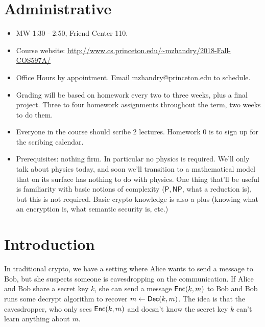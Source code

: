 




\section{Administrative}
\begin{itemize}
\item MW 1:30 - 2:50, Friend Center 110.
\item Course website: \url{http://www.cs.princeton.edu/~mzhandry/2018-Fall-COS597A/}
\item Office Hours by appointment. Email mzhandry@princeton.edu to schedule.
\item Grading will be based on homework every two to three weeks, plus a final project. Three to four homework assignments throughout the term, two weeks to do them.
\item Everyone in the course should scribe 2 lectures. Homework 0 is to sign up for the scribing calendar.
\item Prerequisites: nothing firm. In particular no physics is required. We'll only talk about physics today, and soon we'll transition to a mathematical model that on its surface has nothing to do with physics. One thing that'll be useful is familiarity with basic notions of complexity ($\mathsf{P},\mathsf{NP}$, what a reduction is), but this is not required. Basic crypto knowledge is also a plus (knowing what an encryption is, what semantic security is, etc.)
\end{itemize}

\section{Introduction}
In traditional crypto, we have a setting where Alice wants to send a message to Bob, but she suspects someone is eavesdropping on the communication. If Alice and Bob share a secret key $k$, she can send a message ${\sf{Enc}}(k,m)$ to Bob and Bob runs some decrypt algorithm to recover $m \leftarrow {\sf{Dec}}(k,m)$. The idea is that the eavesdropper, who only sees ${\sf{Enc}}(k,m)$ and doesn't know the secret key $k$ can't learn anything about $m$.

